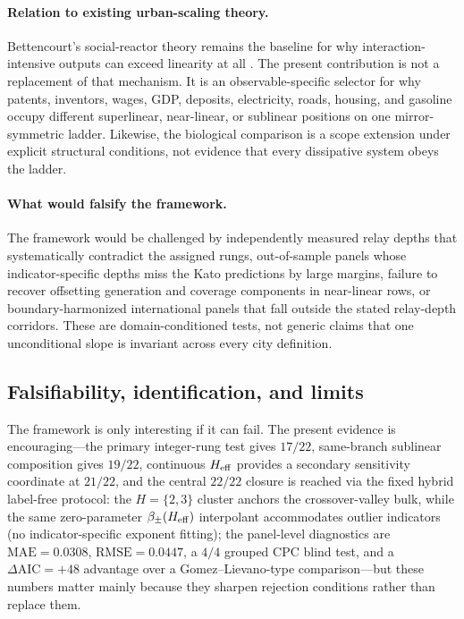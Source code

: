\paragraph{Relation to existing urban-scaling theory.}
Bettencourt's social-reactor theory remains the baseline for why
interaction-intensive outputs can exceed linearity at all
\citep{Bettencourt2007,Bettencourt2013}.  The present contribution is not a
replacement of that mechanism.  It is an observable-specific selector for why
patents, inventors, wages, GDP, deposits, electricity, roads, housing, and
gasoline occupy different superlinear, near-linear, or sublinear positions on
one mirror-symmetric ladder.  Likewise, the biological comparison is a scope
extension under explicit structural conditions, not evidence that every
dissipative system obeys the ladder.

\paragraph{What would falsify the framework.}
The framework would be challenged by independently measured relay depths
that systematically contradict the assigned rungs, out-of-sample panels
whose indicator-specific depths miss the Kato predictions by large margins,
failure to recover offsetting generation and coverage components in
near-linear rows, or boundary-harmonized international panels that fall
outside the stated relay-depth corridors.  These are domain-conditioned
tests, not generic claims that one unconditional slope is invariant across
every city definition.

\subsection{Falsifiability, identification, and limits}
The framework is only interesting if it can fail. The present evidence is
encouraging---the primary integer-rung test gives $17/22$, same-branch
sublinear composition gives $19/22$, continuous $H_{\mathrm{eff}}$ provides a
secondary sensitivity coordinate at $21/22$, and the central $22/22$
closure is reached via the fixed hybrid label-free protocol: the
$H{=}\{2,3\}$ cluster anchors the crossover-valley bulk, while the
same zero-parameter $\beta_{\pm}(H_{\mathrm{eff}})$ interpolant accommodates
outlier indicators (no indicator-specific exponent fitting); the panel-level diagnostics are
$\mathrm{MAE}=0.0308$, $\mathrm{RMSE}=0.0447$, a $4/4$ grouped CPC blind
test, and a $\Delta\mathrm{AIC}=+48$ advantage over a Gomez--Lievano-type
comparison---but these numbers matter
mainly because they sharpen rejection conditions rather than replace them.

